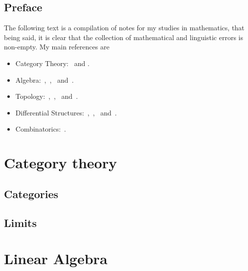 


\frontmatter

\maketitle
\tableofcontents
\listoftodos

\chapter{Preface}

The following text is a compilation of notes for my studies in mathematics, that
being said, it is clear that the collection of mathematical and linguistic
errors is non-empty. My main references are
\begin{itemize}\setlength\itemsep{0em}
\item Category Theory:~\cite{Rie16} and \cite{Shap06}.
\item Algebra:~\cite{Yu89},~\cite{Kim20},~\cite{Aluf09} and~\cite{Lang93}.
\item Topology:~\cite{Lee11},~\cite{Tai20},~\cite{Mun00} and~\cite{Eng89}.
\item Differential Structures:~\cite{Zor15},~\cite{Zor16},~\cite{Rud76}
  and~\cite{Jost06}.
\item Combinatorics:~\cite{Die16}.
\end{itemize}

\mainmatter

\part{Category theory}

\chapter{Categories}





\chapter{Limits}



\part{Linear Algebra}

